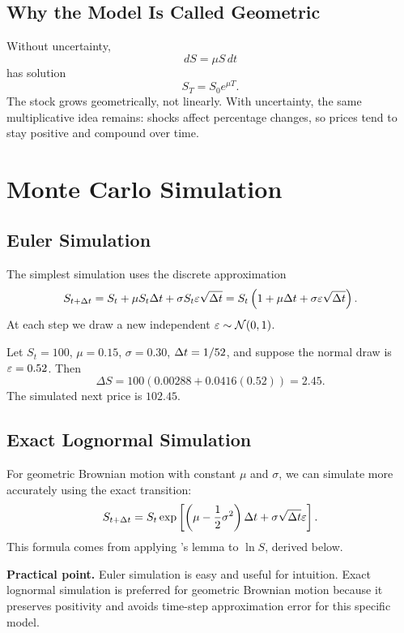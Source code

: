 \subsection{Why the Model Is Called Geometric}

Without uncertainty,
\[
    dS=\mu S\,dt
\]
has solution
\[
    S_T=S_0e^{\mu T}.
\]
The stock grows geometrically, not linearly. With uncertainty, the same
multiplicative idea remains: shocks affect percentage changes, so prices tend
to stay positive and compound over time.

\section{Monte Carlo Simulation}

\subsection{Euler Simulation}

The simplest simulation uses the discrete approximation
\[
    S_{t+\Delta t}
    =
    S_t + \mu S_t\Delta t + \sigma S_t\varepsilon\sqrt{\Delta t}
    =
    S_t\left(1+\mu\Delta t+\sigma\varepsilon\sqrt{\Delta t}\right).
\]
At each step we draw a new independent $\varepsilon\sim\mathcal{N}(0,1)$.

\begin{exmp}
Let $S_t=100$, $\mu=0.15$, $\sigma=0.30$, $\Delta t=1/52$, and suppose the normal
draw is $\varepsilon=0.52$. Then
\[
    \Delta S
    =
    100(0.00288+0.0416(0.52))
    =
    2.45.
\]
The simulated next price is $102.45$.
\end{exmp}

\subsection{Exact Lognormal Simulation}

For geometric Brownian motion with constant $\mu$ and $\sigma$, we can simulate
more accurately using the exact transition:
\[
    S_{t+\Delta t}
    =
    S_t
    \exp\left[
        \left(\mu-\frac{1}{2}\sigma^2\right)\Delta t
        +\sigma\sqrt{\Delta t}\varepsilon
    \right].
\]
This formula comes from applying \Ito's lemma to $\ln S$, derived below.

\begin{boxF}
\textbf{Practical point.} Euler simulation is easy and useful for intuition.
Exact lognormal simulation is preferred for geometric Brownian motion because
it preserves positivity and avoids time-step approximation error for this
specific model.
\end{boxF}

